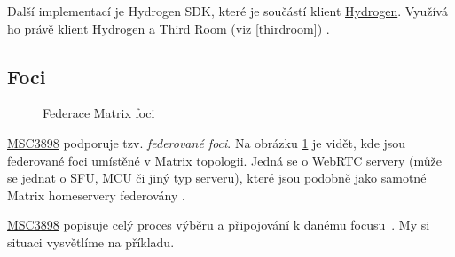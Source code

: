 Další implementací je Hydrogen SDK, které je součástí klient
\href{https://github.com/vector-im/hydrogen-web}{Hydrogen}. Využívá ho právě
klient Hydrogen a Third Room (viz \ref{thirdroom}) \parencite{GitHub-Hydrogen}.

\subsection{Foci}\label{foci}

\begin{figure}[H]
    \centering
    \caption{Federace Matrix foci}
    \label{federatedFoci}
\end{figure}

\href{https://github.com/matrix-org/matrix-spec-proposals/pull/3898}{MSC3898}
podporuje tzv. \textit{federované foci}. Na obrázku \ref{federatedFoci} je
vidět, kde jsou federované foci umístěné v Matrix topologii. Jedná se o WebRTC
servery (může se jednat o SFU, MCU či jiný typ serveru), které jsou podobně jako
samotné Matrix homeservery federovány \parencite{GitHub-MSC3898}.

\href{https://github.com/matrix-org/matrix-spec-proposals/pull/3898}{MSC3898}
popisuje celý proces výběru a připojování k danému focusu~\parencite{GitHub-MSC3898}.
My si situaci vysvětlíme na příkladu.

